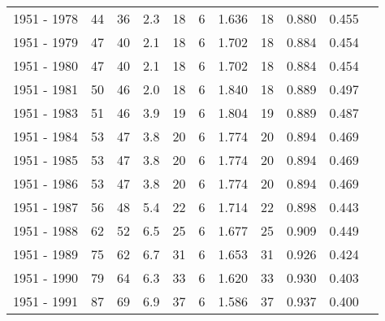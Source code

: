 \begin{tabular}{grgrgrgrgrg}
1951 - 1978 &       44 &       36 &    2.3 &                      18 &                          6 &       1.636 &             18 &       0.880 &             0.455 \\
1951 - 1979 &       47 &       40 &    2.1 &                      18 &                          6 &       1.702 &             18 &       0.884 &             0.454 \\
1951 - 1980 &       47 &       40 &    2.1 &                      18 &                          6 &       1.702 &             18 &       0.884 &             0.454 \\
1951 - 1981 &       50 &       46 &    2.0 &                      18 &                          6 &       1.840 &             18 &       0.889 &             0.497 \\
1951 - 1983 &       51 &       46 &    3.9 &                      19 &                          6 &       1.804 &             19 &       0.889 &             0.487 \\
1951 - 1984 &       53 &       47 &    3.8 &                      20 &                          6 &       1.774 &             20 &       0.894 &             0.469 \\
1951 - 1985 &       53 &       47 &    3.8 &                      20 &                          6 &       1.774 &             20 &       0.894 &             0.469 \\
1951 - 1986 &       53 &       47 &    3.8 &                      20 &                          6 &       1.774 &             20 &       0.894 &             0.469 \\
1951 - 1987 &       56 &       48 &    5.4 &                      22 &                          6 &       1.714 &             22 &       0.898 &             0.443 \\
1951 - 1988 &       62 &       52 &    6.5 &                      25 &                          6 &       1.677 &             25 &       0.909 &             0.449 \\
1951 - 1989 &       75 &       62 &    6.7 &                      31 &                          6 &       1.653 &             31 &       0.926 &             0.424 \\
1951 - 1990 &       79 &       64 &    6.3 &                      33 &                          6 &       1.620 &             33 &       0.930 &             0.403 \\
1951 - 1991 &       87 &       69 &    6.9 &                      37 &                          6 &       1.586 &             37 &       0.937 &             0.400 \\

\end{tabular}
